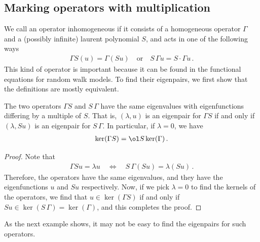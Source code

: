 \subsection{Marking operators with multiplication}
We call an operator inhomogeneous if it consists of a homogeneous operator $\Gamma$ and a (possibly infinite) laurent polynomial $S$, and acts in one of the following ways
 \begin{align}
	\Gamma S(u) = \Gamma(Su)\quad\text{or}\quad S\,\Gamma u = S\cdot \Gamma u\,.
 \end{align}
This kind of operator is important because it can be found in the functional equations for random walk models. To find their eigenpairs, we first show that the definitions are mostly equivalent.
\begin{prop} The two operators $\Gamma S$ and $S\, \Gamma$ have the same eigenvalues with eigenfunctions differing by a multiple of $S$. That is, $(\lambda,u)$ is an eigenpair for $\Gamma S$ if and only if $(\lambda, Su)$ is an eigenpair for $S\,\Gamma$. In particular, if $\lambda = 0$, we have
\begin{align}
	\ker(\Gamma S) = \ol S \ker(\Gamma)\,.
\end{align}
\end{prop}
\begin{proof} Note that
\begin{align}
	\Gamma Su = \lambda u \quad \Longleftrightarrow \quad S\,\Gamma (Su) = \lambda (Su)\,.
\end{align}
Therefore, the operators have the same eigenvalues, and they have the eigenfunctions $u$ and $Su$ respectively. Now, if we pick $\lambda = 0$ to find the kernels of the operators, we find that $u \in \ker(\Gamma S)$ if and only if $Su \in \ker(S\,\Gamma) = \ker(\Gamma)$, and this completes the proof.
\end{proof}
As the next example shows, it may not be easy to find the eigenpairs for such operators.
